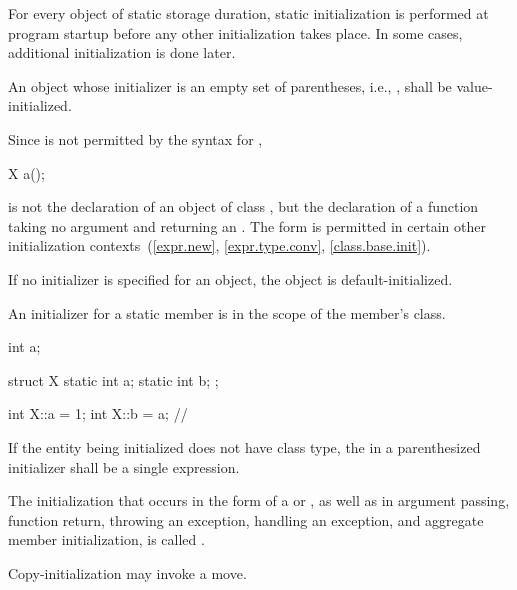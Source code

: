 \pnum
\begin{note}
For every object of static storage duration,
static initialization is performed
at program startup before any other initialization takes place.
In some cases, additional initialization is done later.
\end{note}

\pnum
An object whose initializer is an empty set of parentheses, i.e.,
\tcode{()},
shall be
value-initialized.

%
\begin{note}
Since
\tcode{()}
is not permitted by the syntax for
,
\begin{codeblock}
X a();
\end{codeblock}
is not the declaration of an object of class
,
but the declaration of a function taking no argument and returning an
.
The form
\tcode{()}
is permitted in certain other initialization contexts~(\ref{expr.new},
\ref{expr.type.conv}, \ref{class.base.init}).
\end{note}

\pnum
If no initializer is specified for an object, the object is default-initialized.

\pnum
{}%
An initializer for a static member is in the scope of the member's class.
\begin{example}
\begin{codeblock}
int a;

struct X {
  static int a;
  static int b;
};

int X::a = 1;
int X::b = a;                   // 
\end{codeblock}
\end{example}

\pnum
If the entity being initialized does not have class type, the
 in a
parenthesized initializer shall be a single expression.

\pnum
{}%
%
The initialization that occurs in the \tcode{=} form of a
 or
,
as well as in argument passing, function return,
throwing an exception,
handling an exception,
and aggregate member initialization,
is called
.
\begin{note}
Copy-initialization may invoke a move.
\end{note}

